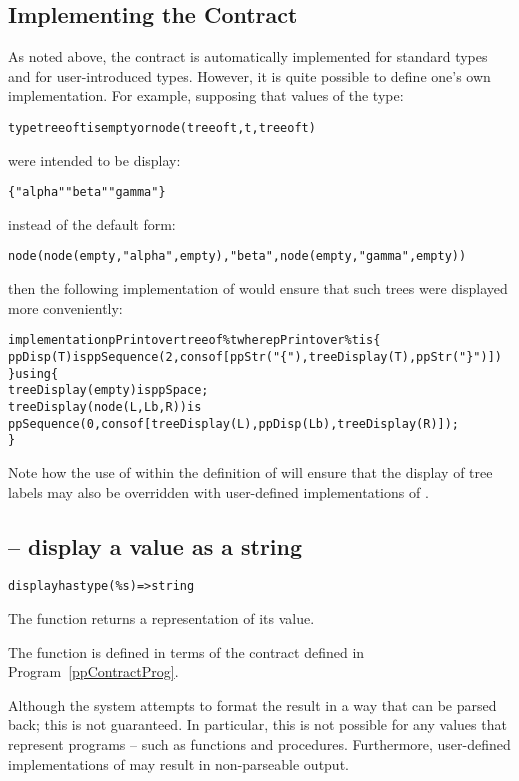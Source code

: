 \subsection{Implementing the  Contract}
As noted above, the  contract is automatically implemented for standard types and for user-introduced types. However, it is quite possible to define one's own implementation. For example, supposing that values of the  type:
\begin{alltt}
type tree of t is empty or node(tree of t,t,tree of t)
\end{alltt}
were intended to be display:
\begin{alltt}
\{ "alpha" "beta" "gamma" \}
\end{alltt}
instead of the default form:
\begin{alltt}
node(node(empty,"alpha",empty),"beta",node(empty,"gamma",empty))
\end{alltt}
then the following implementation of  would ensure that such trees were displayed more conveniently:
\begin{alltt}
implementation pPrint over tree of \%t where pPrint over \%t is \{
  ppDisp(T) is ppSequence(2,cons of [ppStr("\{"), treeDisplay(T), ppStr("\}")])
\} using \{
  treeDisplay(empty) is ppSpace;
  treeDisplay(node(L,Lb,R)) is 
    ppSequence(0,cons of [treeDisplay(L), ppDisp(Lb), treeDisplay(R)]);
\}
\end{alltt}
\begin{aside}
Note how the use of  within the definition of  will ensure that the display of tree labels may also be overridden with user-defined implementations of .
\end{aside}

\subsection{ -- display a value as a string}
\label{displayFunction}
\begin{alltt}
display has type (\%s)=>string
\end{alltt}
The  function returns a  representation of its value.

The  function is defined in terms of the  contract defined in Program~\vref{ppContractProg}.
\begin{aside}
Although the system attempts to format the result in a way that can be parsed back; this is not guaranteed. In particular, this is not possible for any values that represent programs -- such as functions and procedures. Furthermore, user-defined implementations of  may result in non-parseable output.
\end{aside}

